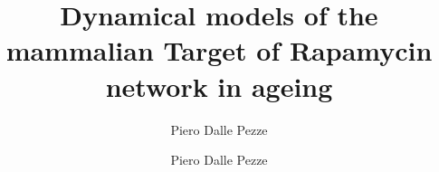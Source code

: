 \documentclass[12pt,a4paper,oneside]{Classes/CUEDthesisPSnPDF}
\title{Dynamical models of the mammalian Target of Rapamycin network in ageing}
\author{Piero Dalle Pezze}
\author{Piero Dalle Pezze}
\begin{document}

%  






\maketitle


\frontmatter %
\renewcommand{\headrulewidth}{0pt} %



%

\renewcommand{\headrulewidth}{0.5pt} %
\tableofcontents
\listoffigures
\listoftables

\clearpage

\printnomenclature[1.0in]  %


\mainmatter  %




 




\end{document}
